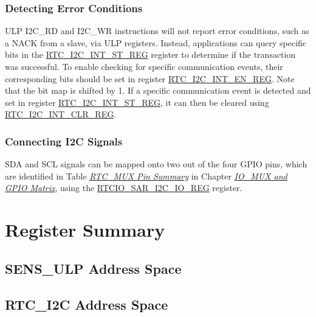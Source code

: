 \documentclass[main\_\_EN.tex]{subfiles}
\begin{document}
\subsubsection{Detecting Error Conditions} \label{paragraph:ULP-detecting-errors}


ULP I2C\_RD and I2C\_WR instructions will not report error conditions, such as a NACK from a slave, via ULP registers. Instead, applications can query specific bits in the \hyperref[regdesc:RTCI2CINTSTREG]{RTC\_I2C\_INT\_ST\_REG} register to determine if the transaction was successful. To enable checking for specific communication events, their corresponding bits should be set in register \hyperref[regdesc:RTCI2CINTENREG]{RTC\_I2C\_INT\_EN\_REG}. Note that the bit map is shifted by 1. If a specific communication event is detected and set in register \hyperref[regdesc:RTCI2CINTSTREG]{RTC\_I2C\_INT\_ST\_REG}, it can then be cleared using \hyperref[regdesc:RTCI2CINTCLRREG]{RTC\_I2C\_INT\_CLR\_REG}.

\subsubsection{Connecting I2C Signals}\label{Connecting I2C Signals}

SDA and SCL signals can be mapped onto two out of the four GPIO pins, which are identified in Table \hyperref[table:rtcmux pads]{\it{RTC\_MUX Pin Summary}} in Chapter \hyperref[{mod:iomuxgpio}]{\it{IO\_MUX and GPIO Matrix}}, using the \hyperref[regdesc:RTCIOSARI2CIOREG]{RTCIO\_SAR\_I2C\_IO\_REG} register.

\clearpage
\hypertarget{ulp-reg-summ}{}
\section{Register Summary}

\subsection{SENS\_ULP Address Space}\label{sec:sens-ulp-reg-summ}



\subsection{RTC\_I2C Address Space}

\label{subsection:RTC_I2C-register-summary}

\end{document}
